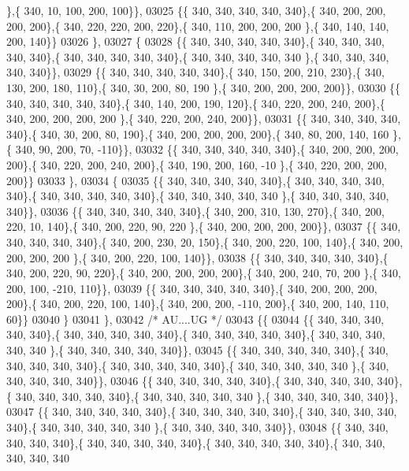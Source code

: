 \begin{DoxyCode}
      \},\{ 340,  10, 100, 200, 100\}\},
03025 \{\{ 340, 340, 340, 340, 340\},\{ 340, 200, 200, 200, 200\},\{ 340, 220, 220, 200, 220\},\{ 340, 110, 200, 200, 200
      \},\{ 340, 140, 140, 200, 140\}\}
03026 \},
03027 \{
03028 \{\{ 340, 340, 340, 340, 340\},\{ 340, 340, 340, 340, 340\},\{ 340, 340, 340, 340, 340\},\{ 340, 340, 340, 340, 340
      \},\{ 340, 340, 340, 340, 340\}\},
03029 \{\{ 340, 340, 340, 340, 340\},\{ 340, 150, 200, 210, 230\},\{ 340, 130, 200, 180, 110\},\{ 340,  30, 200,  80, 190
      \},\{ 340, 200, 200, 200, 200\}\},
03030 \{\{ 340, 340, 340, 340, 340\},\{ 340, 140, 200, 190, 120\},\{ 340, 220, 200, 240, 200\},\{ 340, 200, 200, 200, 200
      \},\{ 340, 220, 200, 240, 200\}\},
03031 \{\{ 340, 340, 340, 340, 340\},\{ 340,  30, 200,  80, 190\},\{ 340, 200, 200, 200, 200\},\{ 340,  80, 200, 140, 160
      \},\{ 340,  90, 200,  70, -110\}\},
03032 \{\{ 340, 340, 340, 340, 340\},\{ 340, 200, 200, 200, 200\},\{ 340, 220, 200, 240, 200\},\{ 340, 190, 200, 160, -10
      \},\{ 340, 220, 200, 200, 200\}\}
03033 \},
03034 \{
03035 \{\{ 340, 340, 340, 340, 340\},\{ 340, 340, 340, 340, 340\},\{ 340, 340, 340, 340, 340\},\{ 340, 340, 340, 340, 340
      \},\{ 340, 340, 340, 340, 340\}\},
03036 \{\{ 340, 340, 340, 340, 340\},\{ 340, 200, 310, 130, 270\},\{ 340, 200, 220,  10, 140\},\{ 340, 200, 220,  90, 220
      \},\{ 340, 200, 200, 200, 200\}\},
03037 \{\{ 340, 340, 340, 340, 340\},\{ 340, 200, 230,  20, 150\},\{ 340, 200, 220, 100, 140\},\{ 340, 200, 200, 200, 200
      \},\{ 340, 200, 220, 100, 140\}\},
03038 \{\{ 340, 340, 340, 340, 340\},\{ 340, 200, 220,  90, 220\},\{ 340, 200, 200, 200, 200\},\{ 340, 200, 240,  70, 200
      \},\{ 340, 200, 100, -210, 110\}\},
03039 \{\{ 340, 340, 340, 340, 340\},\{ 340, 200, 200, 200, 200\},\{ 340, 200, 220, 100, 140\},\{ 340, 200, 200, -110, 
      200\},\{ 340, 200, 140, 110,  60\}\}
03040 \}
03041 \},
03042 \textcolor{comment}{/* AU....UG */}
03043 \{\{
03044 \{\{ 340, 340, 340, 340, 340\},\{ 340, 340, 340, 340, 340\},\{ 340, 340, 340, 340, 340\},\{ 340, 340, 340, 340, 340
      \},\{ 340, 340, 340, 340, 340\}\},
03045 \{\{ 340, 340, 340, 340, 340\},\{ 340, 340, 340, 340, 340\},\{ 340, 340, 340, 340, 340\},\{ 340, 340, 340, 340, 340
      \},\{ 340, 340, 340, 340, 340\}\},
03046 \{\{ 340, 340, 340, 340, 340\},\{ 340, 340, 340, 340, 340\},\{ 340, 340, 340, 340, 340\},\{ 340, 340, 340, 340, 340
      \},\{ 340, 340, 340, 340, 340\}\},
03047 \{\{ 340, 340, 340, 340, 340\},\{ 340, 340, 340, 340, 340\},\{ 340, 340, 340, 340, 340\},\{ 340, 340, 340, 340, 340
      \},\{ 340, 340, 340, 340, 340\}\},
03048 \{\{ 340, 340, 340, 340, 340\},\{ 340, 340, 340, 340, 340\},\{ 340, 340, 340, 340, 340\},\{ 340, 340, 340, 340, 340

\end{DoxyCode}
